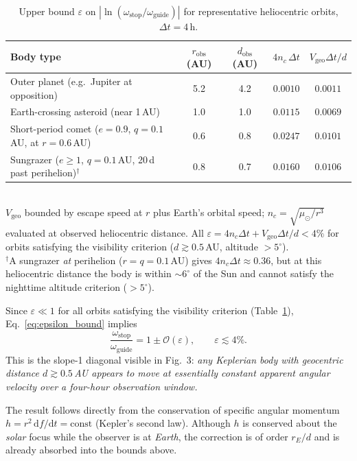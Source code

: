 \documentclass[11pt,a4paper]{article}
\begin{document}
\begin{table}[h]
  \centering
  \caption{Upper bound $\varepsilon$ on $|\ln(\omega_\mathrm{stop}/\omega_\mathrm{guide})|$
    for representative heliocentric orbits, $\Delta t = 4\,\mathrm{h}$.}
  \label{tab:epsilon}
  \small
  \begin{tabular}{@{}p{5.5cm}cccc@{}}
    \toprule
    Body type & $r_\mathrm{obs}$ (AU) & $d_\mathrm{obs}$ (AU) & $4n_c\,\Delta t$ & $V_\mathrm{geo}\Delta t/d$ \\
    \midrule
    Outer planet (e.g.\ Jupiter at opposition) & 5.2  & 4.2  & $0.0010$ & $0.0011$ \\
    Earth-crossing asteroid (near 1\,AU)       & 1.0  & 1.0  & $0.0115$ & $0.0069$ \\
    Short-period comet ($e\!=\!0.9$, $q\!=\!0.1$\,AU, at $r\!=\!0.6$\,AU) & 0.6  & 0.8  & $0.0247$ & $0.0101$ \\
    Sungrazer ($e\!\ge\!1$, $q\!=\!0.1$\,AU, 20\,d past perihelion)$^\dagger$ & 0.8  & 0.7  & $0.0160$ & $0.0106$ \\
    \bottomrule
  \end{tabular}
  \smallskip\\
  {\footnotesize $V_\mathrm{geo}$ bounded by escape speed at $r$ plus Earth's orbital speed;
  $n_c = \sqrt{\mu_\odot/r^3}$ evaluated at observed heliocentric distance.
  All $\varepsilon = 4n_c\Delta t + V_\mathrm{geo}\Delta t/d < 4\%$ for orbits satisfying
  the visibility criterion ($d \gtrsim 0.5$\,AU, altitude $> 5^\circ$). \\
  $^\dagger$A sungrazer \emph{at} perihelion ($r = q = 0.1$\,AU) gives $4n_c\Delta t\approx 0.36$,
  but at this heliocentric distance the body is within ${\sim}6^\circ$ of the Sun
  and cannot satisfy the nighttime altitude criterion ($> 5^\circ$).}
\end{table}

\noindent Since $\varepsilon \ll 1$ for all orbits satisfying the visibility
criterion (Table~\ref{tab:epsilon}), Eq.~\eqref{eq:epsilon_bound} implies
\begin{equation}
  \frac{\omega_\mathrm{stop}}{\omega_\mathrm{guide}} = 1 \pm \mathcal{O}(\varepsilon),
  \qquad \varepsilon \lesssim 4\%.
\end{equation}
This is the slope-1 diagonal visible in Fig.~3: \textit{any Keplerian body with
geocentric distance $d \gtrsim 0.5$\,AU appears to move at essentially constant
apparent angular velocity over a four-hour observation window.}

The result follows directly from the conservation of specific angular
momentum $h = r^2\,\mathrm{d}f/\mathrm{d}t = \mathrm{const}$ (Kepler's
second law). Although $h$ is conserved about the \emph{solar} focus while the
observer is at \emph{Earth}, the correction is of order $r_E/d$ and is already
absorbed into the bounds above.
\end{document}
